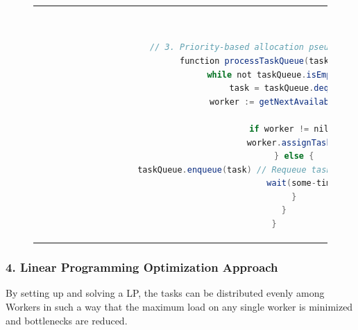     \begin{figure}[htpb]
      \begin{tabular}{c}
      \ \small \begin{lstlisting}[language=Java]
        // 3. Priority-based allocation pseudocode
        function processTaskQueue(taskQueue) {
            while not taskQueue.isEmpty() {
                task = taskQueue.dequeue()
                worker := getNextAvailableWorker()
                
                if worker != nil {
                    worker.assignTask(task)
                } else {
                    taskQueue.enqueue(task) // Requeue task if no Workers are available
                    wait(some-time)
                }
            }
        }
        \end{lstlisting}
      \end{tabular}
      \label{fig:priority-based-allocation}
    \end{figure}

\subsubsection{4. Linear Programming Optimization Approach}

By setting up and solving a \ac{LP}, the tasks can be distributed evenly among Workers in such a way that the maximum load on any single worker is minimized and bottlenecks are reduced.

